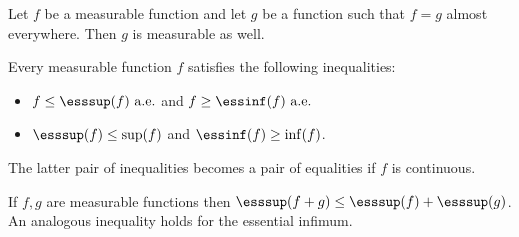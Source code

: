     \begin{property}
        Let $f$ be a measurable function and let $g$ be a function such that $f=g$ almost everywhere. Then $g$ is measurable as well.
    \end{property}

    \begin{property}
        Every measurable function $f$ satisfies the following inequalities:
        \begin{itemize}
            \item $f\leq\esssup(f)\text{ a.e.}$ and $f\geq\essinf(f)\text{ a.e.}$
            \item $\esssup(f)\leq\sup(f)$ and $\essinf(f)\geq\inf(f)$.
        \end{itemize}
        The latter pair of inequalities becomes a pair of equalities if $f$ is continuous.
    \end{property}
    \begin{property}
        If $f,g$ are measurable functions then $\esssup(f+g)\leq\esssup(f) + \esssup(g)$. An analogous inequality holds for the essential infimum.
    \end{property}